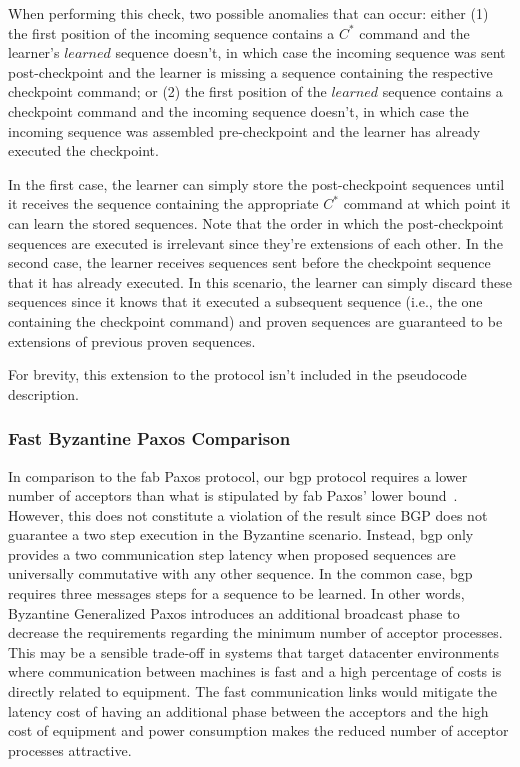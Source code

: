 When performing this check, two possible anomalies that can occur: either (1) the first position of the incoming sequence contains a $C^*$ command and the learner's $learned$ sequence doesn't, in which case the incoming sequence was sent post-checkpoint and the learner is missing a sequence containing the respective checkpoint command; or (2) the first position of the $learned$ sequence contains a checkpoint command and the incoming sequence doesn't, in which case the incoming sequence was assembled pre-checkpoint and the learner has already executed the checkpoint. \par
In the first case, the learner can simply store the post-checkpoint sequences until it receives the sequence containing the appropriate $C^*$ command at which point it can learn the stored sequences. Note that the order in which the post-checkpoint sequences are executed is irrelevant since they're extensions of each other. In the second case, the learner receives sequences sent before the checkpoint sequence that it has already executed. In this scenario, the learner can simply discard these sequences since it knows that it executed a subsequent sequence (i.e., the one containing the checkpoint command) and proven sequences are guaranteed to be extensions of previous proven sequences. \par
For brevity, this extension to the protocol isn't included in the pseudocode description.

\subsubsection{Fast Byzantine Paxos Comparison}
In comparison to the \acrshort{fab} Paxos protocol, our \acrlong{bgp} protocol requires a lower number of acceptors than what is stipulated by \acrshort{fab} Paxos' lower bound~\cite{Martin2006}. However, this does not constitute a violation of the result since BGP does not guarantee a two step execution in the Byzantine scenario. Instead, \acrshort{bgp} only provides a two communication step latency when proposed sequences are universally commutative with any other sequence. In the common case, \acrshort{bgp} requires three messages steps for a sequence to be learned. In other words, Byzantine Generalized Paxos introduces an additional broadcast phase to decrease the requirements regarding the minimum number of acceptor processes. This may be a sensible trade-off in systems that target datacenter environments where communication between machines is fast and a high percentage of costs is directly related to equipment. The fast communication links would mitigate the latency cost of having an additional phase between the acceptors and the high cost of equipment and power consumption makes the reduced number of acceptor processes attractive.